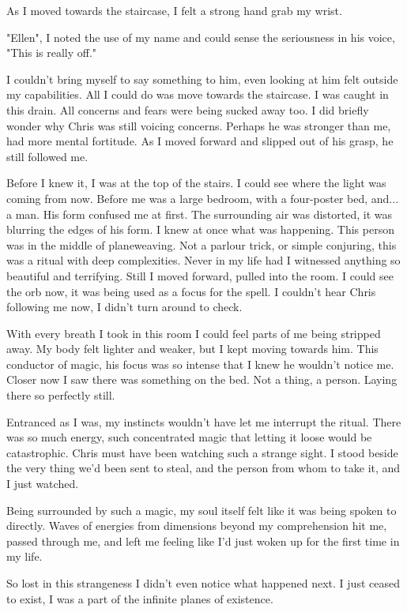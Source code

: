 As I moved towards the staircase, I felt a strong hand grab my wrist.

\begin{dialogue}
    \item{"Ellen", I noted the use of my name and could sense the seriousness in his voice, "This is really off."}
\end{dialogue}

I couldn't bring myself to say something to him, even looking at him felt
outside my capabilities. All I could do was move towards the staircase. I was
caught in this drain. All concerns and fears were being sucked away too. I did
briefly wonder why Chris was still voicing concerns. Perhaps he was stronger than
me, had more mental fortitude. As I moved forward and slipped out of his grasp,
he still followed me.

Before I knew it, I was at the top of the stairs. I could see where the light
was coming from now. Before me was a large bedroom, with a four-poster bed,
and... a man. His form confused me at first. The surrounding air was distorted, it
was blurring the edges of his form. I knew at once what was happening. This
person was in the middle of planeweaving. Not a parlour trick, or simple
conjuring, this was a ritual with deep complexities. Never in my life had I
witnessed anything so beautiful and terrifying. Still I moved forward, pulled
into the room. I could see the orb now, it was being used as a focus for the
spell. I couldn't hear Chris following me now, I didn't turn around to check. 

With every breath I took in this room I could feel parts of me being stripped
away. My body felt lighter and weaker, but I kept moving towards him. This
conductor of magic, his focus was so intense that I knew he wouldn't notice me.
Closer now I saw there was something on the bed. Not a thing, a person. Laying
there so perfectly still. 

Entranced as I was, my instincts wouldn't have let me interrupt the ritual.
There was so much energy, such concentrated magic that letting it loose would be
catastrophic. Chris must have been watching such a strange sight. I stood beside
the very thing we'd been sent to steal, and the person from whom to take it, and
I just watched. 

Being surrounded by such a magic, my soul itself felt like it was being spoken
to directly. Waves of energies from dimensions beyond my comprehension hit me,
passed through me, and left me feeling like I'd just woken up for the first time
in my life. 

So lost in this strangeness I didn't even notice what happened next. I just
ceased to exist, I was a part of the infinite planes of existence.


